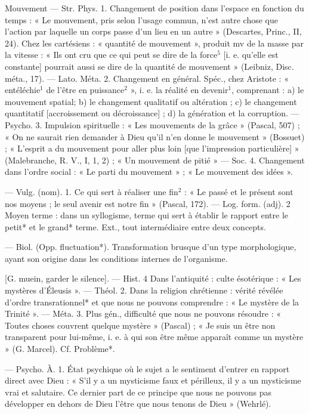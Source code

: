 \begin{itemize}[leftmargin=1cm, label=, itemsep=1pt]
Mouvement\ib{} — Str. Phys. 1. Changement de position dans l’espace en
fonction du temps : « Le mouvement,
pris selon l’usage commun, n’est
autre chose que l’action par laquelle
un corps passe d’un lieu en un
autre » (Descartes, Princ., II, 24).
Chez les cartésiens : « quantité de
mouvement », produit mv de la
masse par la vitesse : « Ils ont cru que
ce qui peut se dire de la force$^5$ [i. e.
qu’elle est constante] pourrait aussi
se dire de la quantité de mouvement » (Leibniz, Disc. méta., 17).
— Lato. Méta. 2. Changement
en général. Spéc., chez Aristote :
« entéléchie$^1$ de l’être en puissance$^2$ »,
i. e. la réalité en devenir$^1$, comprenant : a) le mouvement spatial;
b) le changement qualitatif ou altération ; c) le changement quantitatif
[accroissement ou décroissance] ;
d) la génération et la corruption.
— Psycho. 3. Impulsion spirituelle :
« Les mouvements de la grâce »
(Pascal, 507) ; « On ne saurait rien
demander à Dieu qu'il n’en donne
le mouvement » (Bossuet) ; « L'esprit
a du mouvement pour aller plus
loin [que l'impression particulière] »
(Malebranche, R. V., I, 1, 2) ; « Un
mouvement de pitié » — Soc. 4.
Changement dans l’ordre social :
« Le parti du mouvement » ; « Le
mouvement des idées ».

 — Vulg. (nom). 1. Ce qui sert
à réaliser une fin$^2$ : « Le passé et le
présent sont nos moyens ; le seul
avenir est notre fin » (Pascal, 172).
— Log. form. (adj). 2 Moyen
terme : dans un syllogisme, terme
qui sert à établir le rapport entre le
petit* et le grand* terme. Ext., tout
intermédiaire entre deux concepts.

 — Biol. (Opp. fluctuation*). Transformation brusque d’un
type morphologique, ayant son origine dans les conditions internes de
l'organisme.

 [G. muein, garder le silence].
— Hist. 4 Dans l'antiquité : culte
ésotérique : « Les mystères d'Éleusis ». — Théol. 2. Dans la religion
chrétienne : vérité révélée d'ordre
transrationnel* et que nous ne pouvons comprendre : « Le mystère de
la Trinité ». — Méta. 3. Plus gén.,
difficulté que nous ne pouvons
résoudre : « Toutes choses couvrent
quelque mystère » (Pascal) ; « Je
suis un être non transparent pour
lui-même, i. e. à qui son être même
apparaît comme un mystère »
(G. Marcel). Cf. Problème*.

 — Psycho. À. 1. État
psychique où le sujet a le sentiment
d'entrer en rapport direct avec Dieu :
« S'il y a un mysticisme faux et
périlleux, il y a un mysticisme vrai
et salutaire. Ce dernier part de ce
principe que nous ne pouvons pas
développer en dehors de Dieu l’être
que nous tenons de Dieu » (Wehrlé).


\end{itemize}
